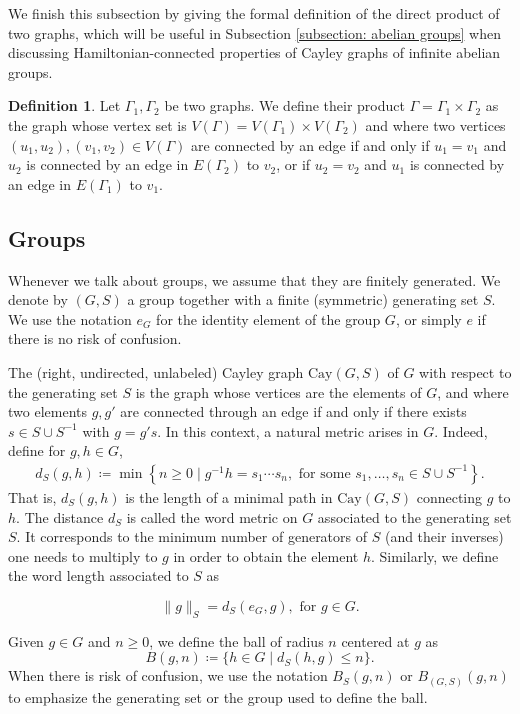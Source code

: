 \documentclass[reqno,oneside]{amsart}
\newcommand{\cay}[2]{\mathrm{Cay}(#1,#2)}
\theoremstyle{plain}
\theoremstyle{definition}
\newtheorem{defn}[thm]{Definition} %
\begin{document}
We finish this subsection by giving the formal definition of the direct product of two graphs, which will be useful in Subsection \ref{subsection: abelian groups} when discussing Hamiltonian-connected properties of Cayley graphs of infinite abelian groups.
\begin{defn}\label{def: product graph}  Let $\Gamma_1,\Gamma_2$ be two graphs. We define their product $\Gamma=\Gamma_1\times \Gamma_2$ as the graph whose vertex set is $V(\Gamma)=V(\Gamma_1)\times V(\Gamma_2)$ and where two vertices $(u_1,u_2), (v_1,v_2)\in V(\Gamma)$ are connected by an edge if and only if $u_1=v_1$ and $u_2$ is connected by an edge in $E(\Gamma_2)$ to $v_2$, or if $u_2=v_2$ and $u_1$ is connected by an edge in $E(\Gamma_1)$ to $v_1$.
\end{defn}

\subsection{Groups}\label{subsection:groups}
Whenever we talk about groups, we assume that they are finitely generated. We denote by $(G,S)$ a group together with a finite (symmetric) generating set $S$. We use the notation $e_G$ for the identity element of the group $G$, or simply $e$ if there is no risk of confusion.

The (right, undirected, unlabeled) Cayley graph $\cay{G}{S}$ of $G$ with respect to the generating set $S$ is the graph whose vertices are the elements of $G$, and where two elements $g,g'$ are connected through an edge if and only if there exists $s\in S\cup S^{-1}$ with $g=g's$. In this context, a natural metric arises in $G$. Indeed, define for $g,h\in G$,
\begin{align*}
d_S(g,h)\coloneqq \min\left\{n\ge 0\mid g^{-1}h=s_1\cdots s_n,\text{ for some }s_1,\ldots,s_n\in S\cup S^{-1}\right\}.
\end{align*}
That is, $d_S(g,h)$ is the length of a minimal path in $\cay{G}{S}$ connecting $g$ to $h$. The distance $d_S$ is called the word metric on $G$ associated to the generating set $S$. It corresponds to the minimum number of generators of $S$ (and their inverses) one needs to multiply to $g$ in order to obtain the element $h$. Similarly, we define the word length associated to $S$ as

$$
\|g\|_{S}=d_S(e_G,g), \text{  for  }g\in G.
$$

Given $g\in G$ and $n\ge 0$, we define the ball of radius $n$ centered at $g$ as
$$
B(g,n)\coloneqq \{ h\in G\mid d_S(h,g)\le n \}.
$$ 
When there is risk of confusion, we use the notation $B_S(g,n)$ or $B_{(G,S)}(g,n)$ to emphasize the generating set or the group used to define the ball.
\end{document}
